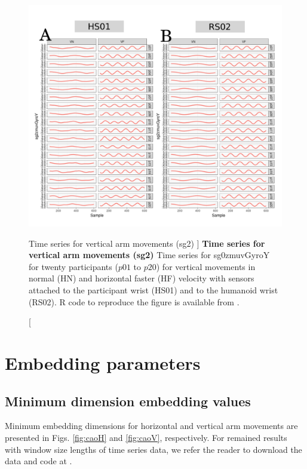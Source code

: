 \begin{figure}
\centering
\includegraphics[width=1.0\textwidth]{aV-sg2}
    	\caption
	[Time series for vertical arm movements (sg2) ]{
	{\bf Time series for vertical arm movements (sg2)}
		Time series for sg0zmuvGyroY for twenty participants 
		($p01$ to  $p20$) 
		for vertical movements in normal (HN) and horizontal faster (HF) 
		velocity with sensors attached to the participant wrist (HS01)
		and to the humanoid wrist (RS02).
	R code to reproduce the figure is available from \cite{hwum2018}.
        }
    \label{fig:aV-sg2}
\end{figure}










\newpage
\section{Embedding parameters} \label{appendix:e:ep}
\subsection{Minimum dimension embedding values}

Minimum embedding dimensions for horizontal and vertical arm movements
are presented in Figs.  \ref{fig:caoH} and \ref{fig:caoV}, respectively.
For remained  results with window size lengths of time series data, we refer
the reader to download the data and code at \cite{hwum2018}.


